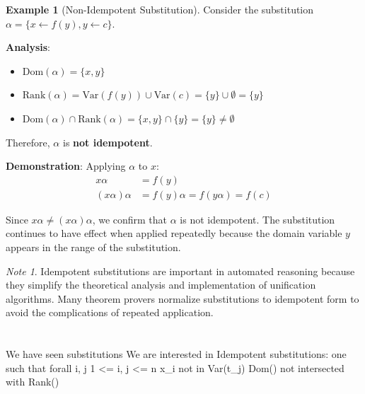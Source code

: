 \documentclass[11pt,a4paper]{article}
\theoremstyle{definition}
\newtheorem{example}{Example}[section]
\theoremstyle{plain}
\theoremstyle{remark}
\newtheorem*{remark}{Note}
\begin{document}
\begin{example}[Non-Idempotent Substitution]
Consider the substitution $\alpha = \{x \leftarrow f(y), y \leftarrow c\}$.

\textbf{Analysis}:
\begin{itemize}
    \item $\text{Dom}(\alpha) = \{x, y\}$
    \item $\text{Rank}(\alpha) = \text{Var}(f(y)) \cup \text{Var}(c) = \{y\} \cup \emptyset = \{y\}$
    \item $\text{Dom}(\alpha) \cap \text{Rank}(\alpha) = \{x, y\} \cap \{y\} = \{y\} \neq \emptyset$
\end{itemize}

Therefore, $\alpha$ is \textbf{not idempotent}.

\textbf{Demonstration}: Applying $\alpha$ to $x$:
\begin{align*}
x\alpha &= f(y) \\
(x\alpha)\alpha &= f(y)\alpha = f(y\alpha) = f(c)
\end{align*}

Since $x\alpha \neq (x\alpha)\alpha$, we confirm that $\alpha$ is not idempotent. The substitution continues to have effect when applied repeatedly because the domain variable $y$ appears in the range of the substitution.
\end{example}

\begin{remark}
Idempotent substitutions are important in automated reasoning because they simplify the theoretical analysis and implementation of unification algorithms. Many theorem provers normalize substitutions to idempotent form to avoid the complications of repeated application.
\end{remark}



\newpage

\iffalse %

\part{}

\section{}

We have seen substitutions \sigma
We are interested in Idempotent substitutions: one such that
forall i, j 1 <= i, j <= n    x_i not in Var(t_j)     Dom(\sigma) not intersected with Rank(\alpha)
\end{document}
